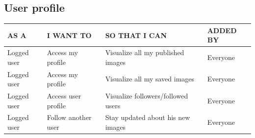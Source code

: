 \documentclass[11pt, a4paper]{article}
\begin{document}
\subsection{User profile}
\begin{table}[H]
    \centering
    \begin{tabular}{|p{3.5cm}|p{4cm}|p{6cm}|p{3cm}|}
    \hline
    \rowcolor[HTML]{EFEFEF} 
    AS A        & I WANT TO             & SO THAT I CAN                         & ADDED BY \\ \hline
    Logged user & Access my profile     & Visualize all my published images     & Everyone \\ \hline 
    Logged user & Access my profile     & Visualize all my saved images         & Everyone \\ \hline 
    Logged user & Access user profile   & Visualize followers/followed users    & Everyone \\ \hline 
    Logged user & Follow another user   & Stay updated about his new images     & Everyone \\ \hline    
    \end{tabular}
\end{table}
\begin{figure}[H]
    \centering
\end{figure}

\end{document}
